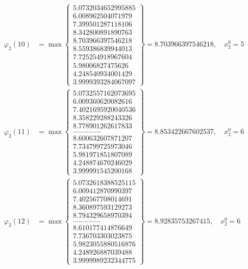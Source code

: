 \documentclass{article}
\begin{document}
\begin{align*}
  
  
  
\varphi_{2}(10) &= \max \left\{ \begin{array}{c}
5.0732034652995885 \\
 6.008962504071979 \\
 7.399501287118106 \\
 8.342800891890763 \\
 8.703966397546218 \\
 8.559386839944013 \\
 7.725254918967604 \\
 5.98006827475626 \\
 4.248540934001429 \\
 3.9999393284067097
\end{array} \right\} = 8.703966397546218, \quad x_{2}^0 = 5\\
  
  
  
  
\varphi_{2}(11) &= \max \left\{ \begin{array}{c}
5.0732557162073695 \\
 6.009360620082616 \\
 7.4021695920040536 \\
 8.358229288243326 \\
 8.778901262617833 \\
 .............. \\
 8.600632607871207 \\
 7.734799725973046 \\
 5.981971851807089 \\
 4.248874670246029 \\
 3.999991545200168
\end{array} \right\} = 8.853422667602537, \quad x_{2}^0 = 6\\
  
  
  
  
\varphi_{2}(12) &= \max \left\{ \begin{array}{c}
5.0732618388525115 \\
 6.009412870990397 \\
 7.402567708014691 \\
 8.360897593129273 \\
 8.794329658970394 \\
 .............. \\
 8.610177414876649 \\
 7.736703303023875 \\
 5.9823055880516876 \\
 4.248926887039488 \\
 3.9999989232344775
\end{array} \right\} = 8.92835753267415, \quad x_{2}^0 = 6\\
  

\end{align*}
\end{document}
